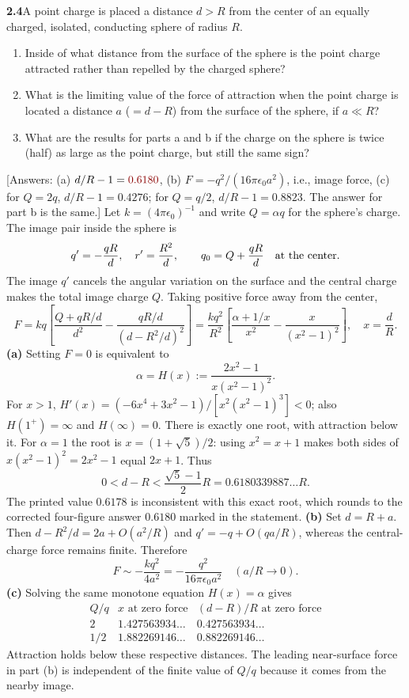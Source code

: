 \par\bigskip
\noindent\textbf{2.4}\quad A point charge is placed a distance $d>R$ from the center of an equally charged, isolated, conducting sphere of radius $R$.
\begin{enumerate}
\item[(a)] Inside of what distance from the surface of the sphere is the point charge attracted rather than repelled by the charged sphere?
\item[(b)] What is the limiting value of the force of attraction when the point charge is located a distance $a$ ($=d-R$) from the surface of the sphere, if $a\ll R$?
\item[(c)] What are the results for parts a and b if the charge on the sphere is twice (half) as large as the point charge, but still the same sign?
\end{enumerate}
[Answers: (a) $d/R-1=\erratum{0.6180}$, (b) $F=-q^{2}/(16\pi\epsilon_{0}a^{2})$, i.e., image force, (c) for $Q=2q$, $d/R-1=0.4276$; for $Q=q/2$, $d/R-1=0.8823$. The answer for part b is the same.]
\solution
Let $k=(4\pi\epsilon _0)^{-1}$ and write $Q=\alpha q$ for the sphere's
charge. The image pair inside the sphere is
\[
q'=-\frac{qR}{d},\quad r'=\frac{R^2}{d},\qquad
q_0=Q+\frac{qR}{d}\quad\hbox{at the center}.
\]
The image $q'$ cancels the angular variation on the surface and the
central charge makes the total image charge $Q$. Taking positive force
away from the center,
\[
F=kq\left[\frac{Q+qR/d}{d^2}
       -\frac{qR/d}{(d-R^2/d)^2}\right]
=\frac{kq^2}{R^2}\left[\frac{\alpha+1/x}{x^2}
                  -\frac{x}{(x^2-1)^2}\right],\quad x=\frac dR.
\]
\textbf{(a)} Setting $F=0$ is equivalent to
\[
\alpha=H(x):=\frac{2x^2-1}{x(x^2-1)^2}.
\]
For $x>1$,
$H'(x)=(-6x^4+3x^2-1)/[x^2(x^2-1)^3]<0$;
also $H(1^+)=\infty$ and $H(\infty)=0$. There is exactly one root,
with attraction below it. For $\alpha=1$ the root is
$x=(1+\sqrt5)/2$: using $x^2=x+1$ makes both sides of
$x(x^2-1)^2=2x^2-1$ equal $2x+1$. Thus
\[
\boxed{0<d-R<\frac{\sqrt5-1}{2}R=0.6180339887\ldots R.}
\]
The printed value $0.6178$ is inconsistent with this exact root,
which rounds to the corrected four-figure answer $0.6180$ marked in
the statement.
\textbf{(b)} Set $d=R+a$. Then
$d-R^2/d=2a+O(a^2/R)$ and $q'=-q+O(qa/R)$,
whereas the central-charge force remains finite. Therefore
\[
\boxed{F\sim-\frac{kq^2}{4a^2}
            =-\frac{q^2}{16\pi\epsilon _0a^2}\quad(a/R\to0).}
\]
\textbf{(c)} Solving the same monotone equation $H(x)=\alpha$ gives
\[
\begin{array}{c|c|c}
Q/q&x\text{ at zero force}&(d-R)/R\text{ at zero force}\\\hline
2&1.427563934\ldots&0.427563934\ldots\\
1/2&1.882269146\ldots&0.882269146\ldots
\end{array}
\]
Attraction holds below these respective distances. The leading
near-surface force in part (b) is independent of the finite value of
$Q/q$ because it comes from the nearby image.

